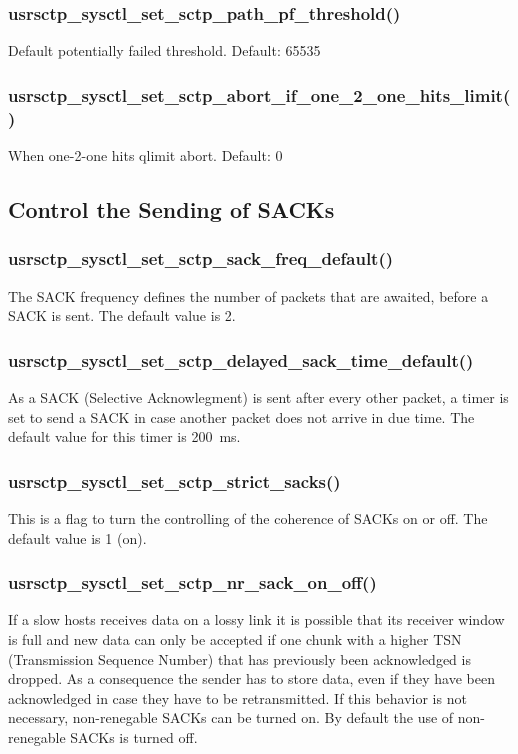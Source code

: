 \documentclass[a4paper]{article}
\begin{document}
\subsubsection{usrsctp\_sysctl\_set\_sctp\_path\_pf\_threshold()}
Default potentially failed threshold. Default: 65535		

\subsubsection{usrsctp\_sysctl\_set\_sctp\_abort\_if\_one\_2\_one\_hits\_limit()}
When one-2-one hits qlimit abort. Default: 0

		
\subsection{Control the Sending of SACKs}
\subsubsection{usrsctp\_sysctl\_set\_sctp\_sack\_freq\_default()}
The SACK frequency defines the number of packets that are awaited, before a SACK is sent. 
The default value is 2.

\subsubsection{usrsctp\_sysctl\_set\_sctp\_delayed\_sack\_time\_default()}
As a SACK (Selective Acknowlegment) is sent after every other packet, a timer is set to send a
SACK in case another packet does not arrive in due time. The default value for this timer is
200~ms.

\subsubsection{usrsctp\_sysctl\_set\_sctp\_strict\_sacks()}
This is a flag to turn the controlling of the coherence of SACKs on or off. The default value is
1 (on).

\subsubsection{usrsctp\_sysctl\_set\_sctp\_nr\_sack\_on\_off()}
If a slow hosts receives data on a lossy link it is possible that its receiver window is full and new 
data can only be accepted if one chunk with a higher TSN (Transmission Sequence Number) that has 
previously been acknowledged is dropped. As a consequence the sender has to store data, even if
they have been acknowledged in case they have to be retransmitted. If this behavior is not necessary,
non-renegable SACKs can be turned on. 
By default the use of non-renegable SACKs is turned off.
\end{document}
